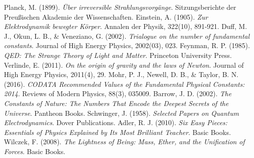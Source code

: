 \documentclass{article}
\begin{document}
	\begin{thebibliography}{10}
		Planck, M. (1899). \textit{Über irreversible Strahlungsvorgänge}. Sitzungsberichte der Preußischen Akademie der Wissenschaften.
		Einstein, A. (1905). \textit{Zur Elektrodynamik bewegter Körper}. Annalen der Physik, 322(10), 891-921.
		Duff, M. J., Okun, L. B., \& Veneziano, G. (2002). \textit{Trialogue on the number of fundamental constants}. Journal of High Energy Physics, 2002(03), 023.
		Feynman, R. P. (1985). \textit{QED: The Strange Theory of Light and Matter}. Princeton University Press.
		Verlinde, E. (2011). \textit{On the origin of gravity and the laws of Newton}. Journal of High Energy Physics, 2011(4), 29.
		Mohr, P. J., Newell, D. B., \& Taylor, B. N. (2016). \textit{CODATA Recommended Values of the Fundamental Physical Constants: 2014}. Reviews of Modern Physics, 88(3), 035009.
		Barrow, J. D. (2002). \textit{The Constants of Nature: The Numbers That Encode the Deepest Secrets of the Universe}. Pantheon Books.
		Schwinger, J. (1958). \textit{Selected Papers on Quantum Electrodynamics}. Dover Publications.
		Adler, R. J. (2010). \textit{Six Easy Pieces: Essentials of Physics Explained by Its Most Brilliant Teacher}. Basic Books.
		Wilczek, F. (2008). \textit{The Lightness of Being: Mass, Ether, and the Unification of Forces}. Basic Books.
	\end{thebibliography}
	
\end{document}
